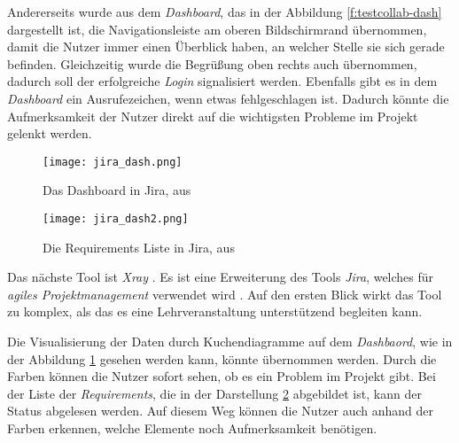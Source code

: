 \documentclass[11pt,a4paper]{report}
\begin{document}
Andererseits wurde aus dem \textit{Dashboard}, das in der Abbildung \ref{f:testcollab-dash} dargestellt ist, die Navigationsleiste am oberen Bildschirmrand übernommen, damit die Nutzer immer einen Überblick haben, an welcher Stelle sie sich gerade befinden. Gleichzeitig wurde die Begrüßung oben rechts auch übernommen, dadurch soll der erfolgreiche \textit{Login} signalisiert werden. Ebenfalls gibt es in dem \textit{Dashboard} ein Ausrufezeichen, wenn etwas fehlgeschlagen ist. Dadurch könnte die Aufmerksamkeit der Nutzer direkt auf die wichtigsten Probleme im Projekt gelenkt werden.

























\begin{figure}[htpb]
  \centering
  \texttt{[image: jira\_dash.png]}
  \caption{Das Dashboard in Jira, aus \cite{xray}}
  \label{f:jiradash}
\end{figure}


\begin{figure}[htpb]
  \centering
  \texttt{[image: jira\_dash2.png]}
  \caption{Die Requirements Liste in Jira, aus \cite{xray}}
  \label{f:jiradash2}
\end{figure}


Das nächste Tool ist \textit{Xray} \cite{xray}. Es ist eine Erweiterung des Tools \textit{Jira}, welches für \textit{agiles Projektmanagement} verwendet wird \cite{jiraxray}. Auf den ersten Blick wirkt das Tool zu komplex, als das es eine Lehrveranstaltung unterstützend begleiten kann.

Die Visualisierung der Daten durch Kuchendiagramme auf dem \textit{Dashbaord}, wie in der Abbildung \ref{f:jiradash} gesehen werden kann, könnte übernommen werden. Durch die Farben können die Nutzer sofort sehen, ob es ein Problem im Projekt gibt. Bei der Liste der \textit{Requirements}, die in der Darstellung \ref{f:jiradash2} abgebildet ist, kann der Status abgelesen werden. Auf diesem Weg können die Nutzer auch anhand der Farben erkennen, welche Elemente noch Aufmerksamkeit benötigen.
\end{document}
